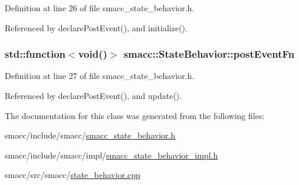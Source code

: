 Definition at line 26 of file smacc\+\_\+state\+\_\+behavior.\+h.



Referenced by declare\+Post\+Event(), and initialize().

\subsubsection[{\texorpdfstring{post\+Event\+Fn}{postEventFn}}]{\setlength{\rightskip}{0pt plus 5cm}std\+::function$<$void()$>$ smacc\+::\+State\+Behavior\+::post\+Event\+Fn}\hypertarget{classsmacc_1_1StateBehavior_aa8485f8a68716ca9429ac8e72e057b7c}{}\label{classsmacc_1_1StateBehavior_aa8485f8a68716ca9429ac8e72e057b7c}


Definition at line 27 of file smacc\+\_\+state\+\_\+behavior.\+h.



Referenced by declare\+Post\+Event(), and update().



The documentation for this class was generated from the following files\+:\begin{DoxyCompactItemize}
\item 
smacc/include/smacc/\hyperlink{smacc__state__behavior_8h}{smacc\+\_\+state\+\_\+behavior.\+h}\item 
smacc/include/smacc/impl/\hyperlink{smacc__state__behavior__impl_8h}{smacc\+\_\+state\+\_\+behavior\+\_\+impl.\+h}\item 
smacc/src/smacc/\hyperlink{state__behavior_8cpp}{state\+\_\+behavior.\+cpp}\end{DoxyCompactItemize}
